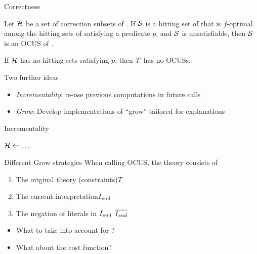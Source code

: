 \documentclass[12pt,aspectratio=169]{beamer}
\begin{document}
\begin{frame}{Correctness}
 \begin{theorem}\label{thm:soundcomplete}
  Let $\mathcal{H}$ be a set of correction subsets of \formula. 
  If $\mathcal{S}$ is a hitting set of \hitset that is $f$-optimal among the hitting sets of \hitset satisfying a predicate $p$, and  $\mathcal{S}$ is unsatisfiable, then $\mathcal{S}$ is an OCUS of \formula. 
  
  If  $\mathcal{H}$ has no hitting sets satisfying $p$, then $T$ has no OCUSs.
\end{theorem}
\end{frame}

\begin{frame}{Two further ideas}
\begin{itemize}
 \item \emph{Incrementality}: re-use previous computations in future calls 
 \item \emph{Grow}: Develop implementations of ``grow'' tailored for explanations
\end{itemize}
 
\end{frame}

\begin{frame}{Incrementality}
 \begin{algorithm}[H]
  \DontPrintSemicolon
 {\bf  $\mathcal{H}  \gets \dots$} \; %
  \caption{$\comus(\formula,f,p)$ }
  \label{alg:comus}
\end{algorithm}
\end{frame}

\begin{frame}{Different Grow strategies}
 When calling OCUS, the theory consists of 
 \begin{enumerate}
  \item The original theory (constraints)\hfill \emph{$T$}
  \item The current interpretation\hfill \emph{$I_{\mathit{end}}$}
  \item The negation of literals in $I_{\mathit{end}}$  \hfill \emph{$\overline{I_{\mathit{end}}}$}
 \end{enumerate}
 
 \begin{itemize}
  \item What to take into account for \emph{}?
  \item What about the cost function?
 \end{itemize}


 

\end{frame}
\end{document}
